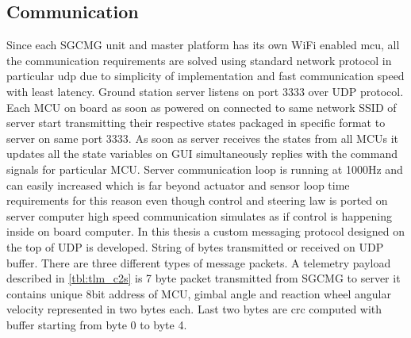 \subsection{Communication}
Since each SGCMG unit and master platform has its own WiFi enabled \acrshort{mcu}, all the communication requirements are solved using standard network protocol in particular \acrfull{udp} due to simplicity of implementation and fast communication speed with least latency. Ground station server listens on port 3333 over UDP protocol. Each MCU on board as soon as powered on connected to same network SSID of server start transmitting their respective states packaged in specific format to server on same port 3333. As soon as server receives the states from all MCUs it updates all the state variables on GUI simultaneously replies with the command signals for particular MCU. Server communication loop is running at 1000Hz and can easily increased which is far beyond actuator and sensor loop time requirements for this reason even though control and steering law is ported on server computer high speed communication simulates as if control is happening inside on board computer. In this thesis a custom messaging protocol designed on the top of UDP is developed. String of bytes transmitted or received on UDP buffer. There are three different types of message packets. A telemetry payload described in \autoref{tbl:tlm_c2s} is 7 byte packet transmitted from SGCMG to server it contains unique 8bit address of MCU, gimbal angle and reaction wheel angular velocity represented in two bytes each. Last two bytes are \acrfull{crc} computed with buffer starting from byte 0 to byte 4.

